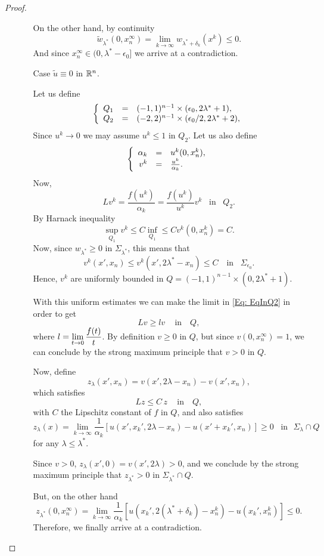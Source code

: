 \begin{proof}
\begin{itemize}
\begin{itemize}
On the other hand, by continuity
$$ \tilde{w}_{\lambda^*} (0,x_n^\infty) = \lim_{k\to\infty} w_{\lambda^*+\delta_k} (x^k) \leq 0.  $$
And since $x_n^\infty \in (0,\lambda^*-\epsilon_0]$ we arrive at a contradiction.


\item[Case ] $\tilde{u}\equiv 0$ in $\mathbb{R}^n$.

Let us define
\begin{equation*}
\left\{\begin{array}{rcll}
Q_1 &=& (-1,1)^{n-1} \times (\epsilon_0,2\lambda^*+1),\\
Q_2 &=& (-2,2)^{n-1} \times (\epsilon_0/2,2\lambda^*+2),
\end{array} \right.
\end{equation*}
Since $u^k \to 0$ we may assume $u^k\leq 1$ in $Q_2$. Let us also define
\begin{equation*}
\left\{\begin{array}{rcll}
\alpha_k &=& u^k(0,x_n^k),\\
v^k &=& \frac{u^k}{\alpha_k}.
\end{array} \right.
\end{equation*}
Now,
\begin{equation}
\label{Eq: EqInQ2}
Lv^k = \frac{f(u^k)}{\alpha_k} = \frac{f(u^k)}{u^k} v^k \,\,\, \text{ in } \,\,\, Q_2.
\end{equation}
By Harnack inequality
$$ \sup_{Q_1} v^k \leq C \inf_{Q_1} \leq C v^k(0,x_n^k) = C. $$
Now, since $w_{\lambda^*}\geq 0$ in $\Sigma_{\lambda^*}$, this means that
$$ v^k(x',x_n) \leq v^k(x',2\lambda^*-x_n) \leq C \,\,\,\, \text{ in } \,\,\, \Sigma_{\epsilon_0}. $$
Hence, $v^k$ are uniformly bounded in $Q = (-1,1)^{n-1} \times (0,2\lambda^*+1)$.

With this uniform estimates we can make the limit in \eqref{Eq: EqInQ2} in order to get
$$ Lv \geq l v\,\,\,\,\,\text{ in } \,\,\,\, Q, $$
where $\displaystyle l = \lim_{t \to 0} \frac{f(t)}{t}$. By definition $v\geq 0$ in $Q$, but since $v(0,x_n^\infty) =1$, we can conclude by the strong maximum principle that $v>0$ in $Q$.

Now, define
$$ z_\lambda (x',x_n) = v(x',2\lambda-x_n) - v(x',x_n), $$
which satisfies
$$ Lz \leq C\, z\,\,\,\,\,\text{ in } \,\,\,\, Q, $$
with $C$ the Lipschitz constant of $f$ in $Q$, and also satisfies
$$ z_\lambda(x) = \lim_{k\to\infty} \frac{1}{\alpha_k} \left[ u(x',x_k',2\lambda-x_n)-u(x'+x_k',x_n) \right] \geq 0 \,\,\,\text{ in } \,\, \Sigma_\lambda\cap Q $$
for any $\lambda\leq \lambda^*$. 

Since $v>0$, $z_\lambda(x',0) = v(x',2\lambda)>0$, and we conclude by the strong maximum principle that $z_{\lambda^*}>0$ in $\Sigma_{\lambda^*}\cap Q$.

But, on the other hand
$$ z_{\lambda^*} (0,x_n^\infty) = \lim_{k\to\infty} \frac{1}{\alpha_k} \left[ u(x_k',2(\lambda^*+\delta_k)-x_n^k) - u(x_k',x_n^k) \right] \leq 0. $$
Therefore, we finally arrive at a contradiction.



\end{itemize}
\end{itemize}
\end{proof}


